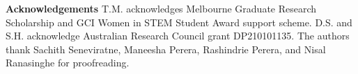 \documentclass[10pt,twocolumn,letterpaper]{article}
\begin{document}
\textbf{Acknowledgements} T.M. acknowledges Melbourne Graduate Research Scholarship and
GCI Women in STEM Student Award support scheme. D.S. and S.H.
acknowledge Australian Research Council grant DP210101135. The authors thank Sachith Seneviratne, Maneesha Perera, Rashindrie Perera, and Nisal Ranasinghe for proofreading.


{\small


}
\end{document}
